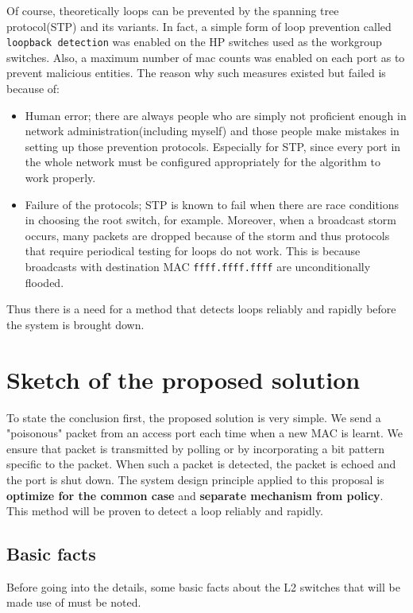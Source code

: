 \documentclass{article}
\begin{document}
Of course, theoretically loops can be prevented by the spanning tree protocol(STP) and its variants. In fact, a simple form of loop prevention called \texttt{loopback detection} was enabled on the HP switches used as the workgroup switches\cite{lbd-hp}. Also, a maximum number of mac counts was enabled on each port as to prevent malicious entities. The reason why such measures existed but failed is because of:
\begin{itemize}
    \item Human error; there are always people who are simply not proficient enough in network administration(including myself) and those people make mistakes in setting up those prevention protocols. Especially for STP, since every port in the whole network must be configured appropriately for the algorithm to work properly.
    \item Failure of the protocols; STP is known to fail when there are race conditions in choosing the root switch, for example. Moreover, when a broadcast storm occurs, many packets are dropped because of the storm and thus protocols that require periodical testing for loops do not work. This is because broadcasts with destination MAC \texttt{ffff.ffff.ffff} are unconditionally flooded.
\end{itemize}

Thus there is a need for a method that detects loops reliably and rapidly before the system is brought down.

\section{Sketch of the proposed solution}

To state the conclusion first, the proposed solution is very simple. We send a "poisonous" packet from an access port each time when a new MAC is learnt. We ensure that packet is transmitted by polling or by incorporating a bit pattern specific to the packet. When such a packet is detected, the packet is echoed and the port is shut down. The system design principle applied to this proposal is \textbf{optimize for the common case} and \textbf{separate mechanism from policy}. This method will be proven to detect a loop reliably and rapidly.

\subsection{Basic facts}

Before going into the details, some basic facts about the L2 switches that will be made use of must be noted.
\end{document}

